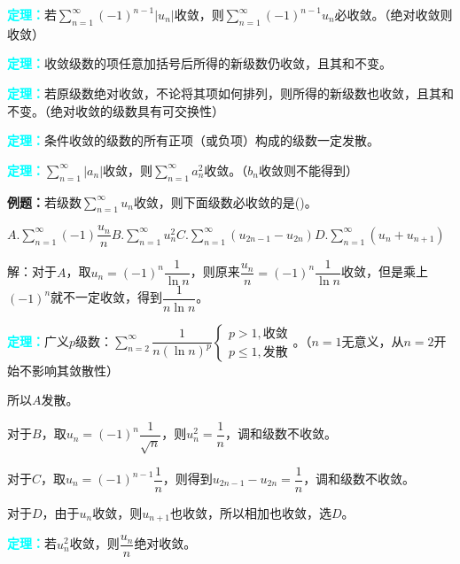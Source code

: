 \documentclass[UTF8, 12pt]{ctexart}
\begin{document}
        \textcolor{aqua}{\textbf{定理：}}若$\sum\limits_{n=1}^\infty(-1)^{n-1}\vert u_n\vert$收敛，则$\sum\limits_{n=1}^\infty(-1)^{n-1}u_n$必收敛。（绝对收敛则收敛）

        \textcolor{aqua}{\textbf{定理：}}收敛级数的项任意加括号后所得的新级数仍收敛，且其和不变。

        \textcolor{aqua}{\textbf{定理：}}若原级数绝对收敛，不论将其项如何排列，则所得的新级数也收敛，且其和不变。（绝对收敛的级数具有可交换性）

        \textcolor{aqua}{\textbf{定理：}}条件收敛的级数的所有正项（或负项）构成的级数一定发散。

        \textcolor{aqua}{\textbf{定理：}}$\sum\limits_{n=1}^\infty\vert a_n\vert$收敛，则$\sum\limits_{n=1}^\infty a_n^2$收敛。（$b_n$收敛则不能得到）

        \textbf{例题：}若级数$\sum\limits_{n=1}^\infty u_n$收敛，则下面级数必收敛的是()。

        $A.\sum\limits_{n=1}^\infty(-1)\dfrac{u_n}{n}$\qquad$B.\sum\limits_{n=1}^\infty u_n^2$\qquad$C.\sum\limits_{n=1}^\infty(u_{2n-1}-u_{2n})$\qquad$D.\sum\limits_{n=1}^\infty(u_n+u_{n+1})$

        解：对于$A$，取$u_n=(-1)^n\dfrac{1}{\ln n}$，则原来$\dfrac{u_n}{n}=(-1)^n\dfrac{1}{\ln n}$收敛，但是乘上$(-1)^n$就不一定收敛，得到$\dfrac{1}{n\ln n}$。

        \textcolor{aqua}{\textbf{定理：}}广义$p$级数：$\sum\limits_{n=2}^\infty\dfrac{1}{n(\ln n)^p}\left\{\begin{array}{l}
                                                                                                             p>1, \text{收敛} \\
                                                                                                             p\leqslant1, \text{发散}
        \end{array}\right.$。（$n=1$无意义，从$n=2$开始不影响其敛散性）

        所以$A$发散。

        对于$B$，取$u_n=(-1)^n\dfrac{1}{\sqrt{n}}$，则$u_n^2=\dfrac{1}{n}$，调和级数不收敛。

        对于$C$，取$u_n=(-1)^{n-1}\dfrac{1}{n}$，则得到$u_{2n-1}-u_{2n}=\dfrac{1}{n}$，调和级数不收敛。

        对于$D$，由于$u_n$收敛，则$u_{n+1}$也收敛，所以相加也收敛，选$D$。

        \textcolor{aqua}{\textbf{定理：}}若$u_n^2$收敛，则$\dfrac{u_n}{n}$绝对收敛。
\end{document}

